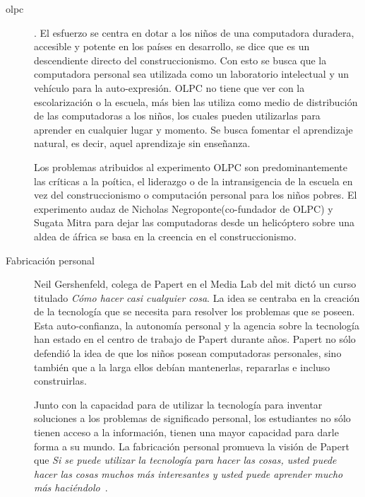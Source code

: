 \begin{description}


\item[\Gls{olpc}]. El esfuerzo se centra en dotar a los niños de una computadora
	duradera, accesible y potente en los países en desarrollo, se dice que
	es un descendiente directo del construccionismo. Con esto se busca que
	la computadora personal sea utilizada como un laboratorio intelectual y
	un vehículo para la auto-expresión. OLPC no tiene que ver con la
	escolarización o la escuela, más bien las utiliza como medio de
	distribución de las computadoras a los niños, los cuales pueden
	utilizarlas para aprender en cualquier lugar y momento. Se busca
	fomentar el aprendizaje natural, es decir, aquel aprendizaje sin
	enseñanza.

	Los problemas atribuidos al experimento OLPC son predominantemente las 
	críticas a la poítica, el liderazgo	o de la intransigencia de la escuela
	en vez del construccionismo o computación personal para los niños pobres.
	El experimento audaz de Nicholas Negroponte(co-fundador de OLPC) y Sugata Mitra
	para dejar las computadoras desde un helicóptero sobre una aldea de áfrica
	se basa en la creencia en el construccionismo\cite{papertian:const}.

\item[Fabricación personal] Neil Gershenfeld, colega de Papert en el Media Lab
	del \Gls{mit} dictó un curso titulado \emph{Cómo hacer casi cualquier
	cosa}. La idea se centraba en la creación de  la tecnología que se
	necesita para resolver los problemas que se poseen. Esta auto-confianza, la
	autonomía personal y la agencia sobre la tecnología han estado en el centro de
	trabajo de Papert durante años. Papert no sólo defendió la idea de que los niños
	posean computadoras personales, sino también que a la larga ellos debían mantenerlas,
	repararlas e incluso construirlas.

	Junto con la capacidad para de utilizar la tecnología para inventar soluciones
	a los problemas de significado personal, los estudiantes no sólo tienen acceso 
	a la información, tienen una mayor capacidad para darle forma a su mundo. La
	fabricación personal promueva la visión de Papert que \emph{Si se puede utilizar la
	tecnología para hacer las cosas, usted puede hacer las cosas muchos más interesantes y
	usted puede aprender mucho más haciéndolo}~\cite{papertian:const}.

\end{description}

